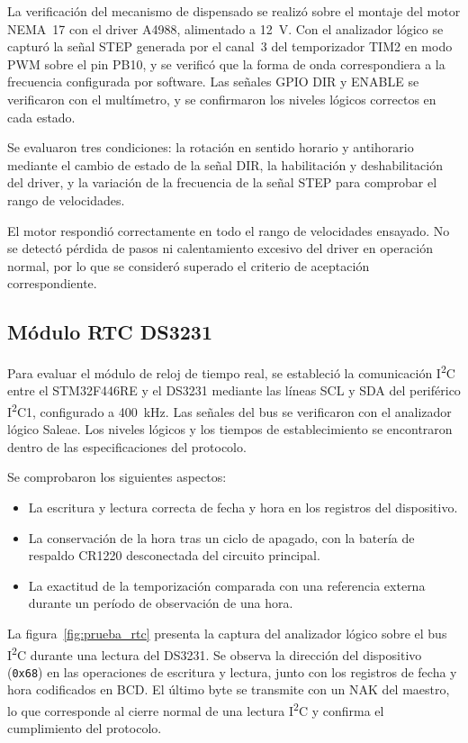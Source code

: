 La verificación del mecanismo de dispensado se realizó sobre el montaje del motor
NEMA~17 con el driver A4988, alimentado a 12~V. Con el analizador lógico
se capturó la señal STEP generada por el canal~3 del temporizador TIM2 en modo PWM
sobre el pin PB10, y se verificó que la forma de onda correspondiera a la
frecuencia configurada por software. Las señales GPIO DIR y ENABLE se
verificaron con el multímetro, y se confirmaron los niveles lógicos correctos en cada
estado.

Se evaluaron tres condiciones: la rotación en sentido horario y antihorario
mediante el cambio de estado de la señal DIR, la habilitación y deshabilitación
del driver, y la variación de la frecuencia de la señal STEP para
comprobar el rango de velocidades.

El motor respondió correctamente en todo el rango de velocidades ensayado.
No se detectó pérdida de pasos ni calentamiento excesivo del driver
en operación normal, por lo que se consideró superado el criterio de aceptación
correspondiente.

\subsection{Módulo RTC DS3231}

Para evaluar el módulo de reloj de tiempo real, se estableció la comunicación
I\textsuperscript{2}C entre el STM32F446RE y el DS3231 mediante las líneas SCL
y SDA del periférico I\textsuperscript{2}C1, configurado a 400~kHz. Las señales del bus se verificaron con el analizador lógico Saleae. Los niveles lógicos y los tiempos de establecimiento  se encontraron dentro de las especificaciones del protocolo.

Se comprobaron los siguientes aspectos:

\begin{itemize}
    \item La escritura y lectura correcta de fecha y hora en los registros del \mbox{dispositivo}.
    \item La conservación de la hora tras un ciclo de apagado, con la batería de
    respaldo CR1220 desconectada del circuito principal.
    \item La exactitud de la temporización comparada con una referencia externa
    durante un período de observación de una hora.
\end{itemize}

La figura~\ref{fig:prueba_rtc} presenta la
captura del analizador lógico sobre el bus I\textsuperscript{2}C durante una
lectura del DS3231. Se observa la dirección del dispositivo (\texttt{0x68}) en las
operaciones de escritura y lectura, junto con los registros de fecha y hora
codificados en BCD. El último byte se transmite con un NAK del maestro, lo que
corresponde al cierre normal de una lectura I\textsuperscript{2}C y confirma el
cumplimiento del protocolo.

